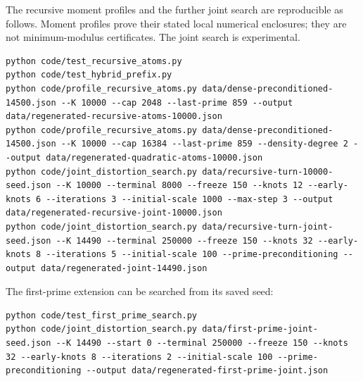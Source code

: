 \documentclass[11pt]{article}
\begin{document}
The recursive moment profiles and the further joint search are reproducible
as follows. Moment profiles prove their stated local numerical enclosures;
they are not minimum-modulus certificates. The joint search is experimental.
\begin{lstlisting}[basicstyle=\ttfamily\small,breaklines=true]
python code/test_recursive_atoms.py
python code/test_hybrid_prefix.py
python code/profile_recursive_atoms.py data/dense-preconditioned-14500.json --K 10000 --cap 2048 --last-prime 859 --output data/regenerated-recursive-atoms-10000.json
python code/profile_recursive_atoms.py data/dense-preconditioned-14500.json --K 10000 --cap 16384 --last-prime 859 --density-degree 2 --output data/regenerated-quadratic-atoms-10000.json
python code/joint_distortion_search.py data/recursive-turn-10000-seed.json --K 10000 --terminal 8000 --freeze 150 --knots 12 --early-knots 6 --iterations 3 --initial-scale 1000 --max-step 3 --output data/regenerated-recursive-joint-10000.json
python code/joint_distortion_search.py data/recursive-turn-joint-seed.json --K 14490 --terminal 250000 --freeze 150 --knots 32 --early-knots 8 --iterations 5 --initial-scale 100 --prime-preconditioning --output data/regenerated-joint-14490.json
\end{lstlisting}

The first-prime extension can be searched from its saved seed:
\begin{lstlisting}[basicstyle=\ttfamily\small,breaklines=true]
python code/test_first_prime_search.py
python code/joint_distortion_search.py data/first-prime-joint-seed.json --K 14490 --start 0 --terminal 250000 --freeze 150 --knots 32 --early-knots 8 --iterations 2 --initial-scale 100 --prime-preconditioning --output data/regenerated-first-prime-joint.json
\end{lstlisting}
\end{document}
